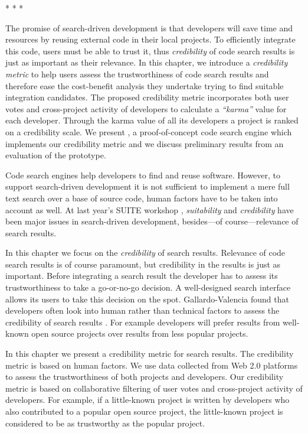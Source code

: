 \documentclass[10pt]{book}
\begin{document}
\begin{center}* * *
\end{center}

The promise of search-driven development is that developers will save time and resources by reusing external code in their local projects. To efficiently integrate this code, users must be able to trust it, thus \emph{credibility} of code search results is just as important as their relevance. 
%
In this chapter, we introduce a \emph{credibility metric} to help users assess the trustworthiness of code search results and therefore ease the cost-benefit analysis they undertake trying to find suitable integration candidates. The proposed credibility metric incorporates both user votes and cross-project activity of developers to calculate a \emph{``karma''} value for each developer. Through the karma value of all its developers a project is ranked on a credibility scale.
%
We present \Jbd, a proof-of-concept code search engine which implements our credibility metric and we discuss preliminary results from an evaluation of the prototype.

Code search engines help developers to find and reuse software. However, to support search-driven development it is not sufficient to implement a mere full text search over a base of source code, human factors have to be taken into account as well. At last year's SUITE workshop \cite{Kuhn09a}, \emph{suitability} and \emph{credibility} have been major issues in search-driven development, besides---of course---relevance of search results.  

In this chapter we focus on the \emph{credibility} of search results. Relevance of code search results is of course paramount, but credibility in the results is just as important. Before integrating a search result the developer has to assess its trustworthiness to take a go-or-no-go decision. A well-designed search interface allows its users to take this decision on the spot. Gallardo-Valencia \etal found that developers often look into human rather than technical factors to assess the credibility of search results \cite{Gall09a}. For example developers will prefer results from well-known open source projects over results from less popular projects.

In this chapter we present a credibility metric for search results. The credibility metric is based on human factors. We use data collected from Web 2.0 platforms to assess the trustworthiness of both projects and developers. Our credibility metric is based on collaborative filtering of user votes and cross-project activity of developers. For example, if a little-known project is written by developers who also contributed to a popular open source project, the little-known project is considered to be as trustworthy as the popular project. 
\end{document}
